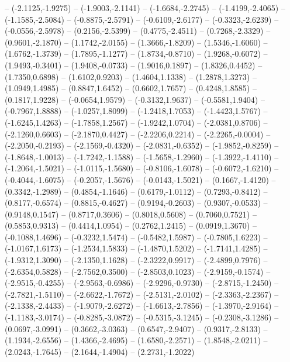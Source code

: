 {	-- (-2.1125,-1.9275)
	-- (-1.9003,-2.1141)
	-- (-1.6684,-2.2745)
	-- (-1.4199,-2.4065)
	-- (-1.1585,-2.5084)
	-- (-0.8875,-2.5791)
	-- (-0.6109,-2.6177)
	-- (-0.3323,-2.6239)
	-- (-0.0556,-2.5978)
	-- (0.2156,-2.5399)
	-- (0.4775,-2.4511)
	-- (0.7268,-2.3329)
	-- (0.9601,-2.1870)
	-- (1.1742,-2.0155)
	-- (1.3666,-1.8209)
	-- (1.5346,-1.6060)
	-- (1.6762,-1.3739)
	-- (1.7895,-1.1277)
	-- (1.8734,-0.8710)
	-- (1.9268,-0.6072)
	-- (1.9493,-0.3401)
	-- (1.9408,-0.0733)
	-- (1.9016,0.1897)
	-- (1.8326,0.4452)
	-- (1.7350,0.6898)
	-- (1.6102,0.9203)
	-- (1.4604,1.1338)
	-- (1.2878,1.3273)
	-- (1.0949,1.4985)
	-- (0.8847,1.6452)
	-- (0.6602,1.7657)
	-- (0.4248,1.8585)
	-- (0.1817,1.9228)
	-- (-0.0654,1.9579)
	-- (-0.3132,1.9637)
	-- (-0.5581,1.9404)
	-- (-0.7967,1.8888)
	-- (-1.0257,1.8099)
	-- (-1.2418,1.7053)
	-- (-1.4423,1.5767)
	-- (-1.6245,1.4263)
	-- (-1.7858,1.2567)
	-- (-1.9242,1.0704)
	-- (-2.0381,0.8706)
	-- (-2.1260,0.6603)
	-- (-2.1870,0.4427)
	-- (-2.2206,0.2214)
	-- (-2.2265,-0.0004)
	-- (-2.2050,-0.2193)
	-- (-2.1569,-0.4320)
	-- (-2.0831,-0.6352)
	-- (-1.9852,-0.8259)
	-- (-1.8648,-1.0013)
	-- (-1.7242,-1.1588)
	-- (-1.5658,-1.2960)
	-- (-1.3922,-1.4110)
	-- (-1.2064,-1.5021)
	-- (-1.0115,-1.5680)
	-- (-0.8106,-1.6078)
	-- (-0.6072,-1.6210)
	-- (-0.4044,-1.6075)
	-- (-0.2057,-1.5676)
	-- (-0.0143,-1.5021)
	-- (0.1667,-1.4120)
	-- (0.3342,-1.2989)
	-- (0.4854,-1.1646)
	-- (0.6179,-1.0112)
	-- (0.7293,-0.8412)
	-- (0.8177,-0.6574)
	-- (0.8815,-0.4627)
	-- (0.9194,-0.2603)
	-- (0.9307,-0.0533)
	-- (0.9148,0.1547)
	-- (0.8717,0.3606)
	-- (0.8018,0.5608)
	-- (0.7060,0.7521)
	-- (0.5853,0.9313)
	-- (0.4414,1.0954)
	-- (0.2762,1.2415)
	-- (0.0919,1.3670)
	-- (-0.1088,1.4696)
	-- (-0.3232,1.5474)
	-- (-0.5482,1.5987)
	-- (-0.7805,1.6223)
	-- (-1.0167,1.6173)
	-- (-1.2534,1.5833)
	-- (-1.4870,1.5202)
	-- (-1.7141,1.4285)
	-- (-1.9312,1.3090)
	-- (-2.1350,1.1628)
	-- (-2.3222,0.9917)
	-- (-2.4899,0.7976)
	-- (-2.6354,0.5828)
	-- (-2.7562,0.3500)
	-- (-2.8503,0.1023)
	-- (-2.9159,-0.1574)
	-- (-2.9515,-0.4255)
	-- (-2.9563,-0.6986)
	-- (-2.9296,-0.9730)
	-- (-2.8715,-1.2450)
	-- (-2.7821,-1.5110)
	-- (-2.6622,-1.7672)
	-- (-2.5131,-2.0102)
	-- (-2.3363,-2.2367)
	-- (-2.1338,-2.4433)
	-- (-1.9079,-2.6272)
	-- (-1.6613,-2.7856)
	-- (-1.3970,-2.9164)
	-- (-1.1183,-3.0174)
	-- (-0.8285,-3.0872)
	-- (-0.5315,-3.1245)
	-- (-0.2308,-3.1286)
	-- (0.0697,-3.0991)
	-- (0.3662,-3.0363)
	-- (0.6547,-2.9407)
	-- (0.9317,-2.8133)
	-- (1.1934,-2.6556)
	-- (1.4366,-2.4695)
	-- (1.6580,-2.2571)
	-- (1.8548,-2.0211)
	-- (2.0243,-1.7645)
	-- (2.1644,-1.4904)
	-- (2.2731,-1.2022)
}
